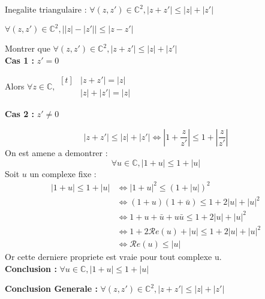 \documentclass[12pt,twoside,a4paper]{article}
\begin{document}
		\begin{prop}
			Inegalite triangulaire : $\forall\left(z,z'\right)\in\mathbb{C}^2,\left|z+z'\right|\leq\left|z\right|+\left|z'\right|$
		\end{prop}
		\begin{coro}
			$\forall\left(z,z'\right)\in\mathbb{C}^2,\left|\left|z\right|-\left|z'\right|\right|\leq\left|z-z'\right|$
		\end{coro}
		\begin{preuve}
			Montrer que $\forall\left(z,z'\right)\in\mathbb{C}^2,\left|z+z'\right|\leq\left|z\right|+\left|z'\right|$ \\
			\textbf{Cas 1 :} $z'=0$
			\begin{tab}
				Alors $\forall z\in\mathbb{C},\begin{aligned}[t]&\left|z+z'\right|=\left|z\right| \\
																		 &\left|z\right|+\left|z'\right|=\left|z\right|\end{aligned}$
			\end{tab}
			\textbf{Cas 2 :} $z'\neq0$
			\begin{tab}
				$$\left|z+z'\right|\leq\left|z\right|+\left|z'\right|\iff\left|1+\frac{z}{z'}\right|\leq 1+\left|\frac{z}{z'}\right|$$
				On est amene a demontrer :
				$$\forall u\in\mathbb{C},\left|1+u\right|\leq 1+\left|u\right|$$
				Soit $u$ un complexe fixe :
				$$\begin{aligned}
					\left|1+u\right|\leq 1+\left|u\right|&\iff\left|1+u\right|^2\leq\left(1+\left|u\right|\right)^2 \\
																&\iff\left(1+u\right)\left(1+\bar{u}\right)\leq1+2\left|u\right|+\left|u\right|^2 \\
																&\iff1+u+\bar{u}+u\bar{u}\leq1+2\left|u\right|+\left|u\right|^2 \\
																&\iff1+2\mathcal{R}e\left(u\right)+\left|u\right|\leq1+2\left|u\right|+\left|u\right|^2 \\
																&\iff\mathcal{R}e\left(u\right)\leq\left|u\right|
				\end{aligned}$$
				Or cette derniere propriete est vraie pour tout complexe u. \\
				\textbf{Conclusion :} $\forall u\in\mathbb{C},\left|1+u\right|\leq 1+\left|u\right|$
			\end{tab}
			\textbf{Conclusion Generale :} $\forall\left(z,z'\right)\in\mathbb{C}^2,\left|z+z'\right|\leq\left|z\right|+\left|z'\right|$
		\end{preuve}
\end{document}
